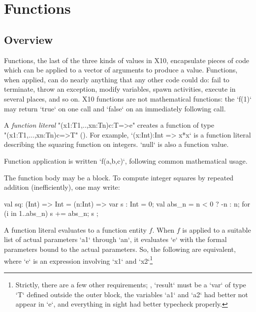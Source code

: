 

\chapter{Functions}
\label{Functions}
\label{functions}
\label{Closures}

\section{Overview}
Functions, the last of the three kinds of values in X10, encapsulate pieces of
code which can be applied to a vector of arguments to produce a value.
Functions, when applied, can do nearly anything that any other code could do:
fail to terminate, throw an exception, modify variables, spawn activities,
execute in several places, and so on. X10 functions are not mathematical
functions: the \xcd`f(1)` may return \xcd`true` on one call and \xcd`false` on
an immediately following call.



A \emph{function literal} \xcd"(x1:T1,..,xn:Tn){c}:T=>e" creates a function of
type\\ \xcd"(x1:T1,...,xn:Tn){c}=>T" ().  For example, 
\xcd`(x:Int):Int => x*x` is a function literal describing the squaring function on
integers.   
\xcd`null` is also a function value.


Function application is written \xcd`f(a,b,c)`, following common mathematical
usage. 


The function body may be a block.  To compute integer squares by repeated
addition (inefficiently), one may write: 
\begin{xten}
val sq: (Int) => Int 
      = (n:Int) => {
           var s : Int = 0;
           val abs_n = n < 0 ? -n : n;
           for (i in 1..abs_n) s += abs_n;
           s
        };
\end{xten}




A function literal evaluates to a function entity $f$. When {$f$} is
applied to a suitable list of actual parameters \xcd`a1` through \xcd`an`, it
evaluates \xcd`e` with the formal parameters bound to the actual parameters.
So, the following are equivalent, where \xcd`e` is an expression involving
\xcd`x1` and \xcd`x2`\footnote{Strictly, there are a few other requirements;
  \eg, \xcd`result` must be a \xcd`var` of type \xcd`T` defined outside the
  outer block, the variables \xcd`a1` and \xcd`a2` had better not appear in
  \xcd`e`, and everything in sight had better typecheck properly.}

